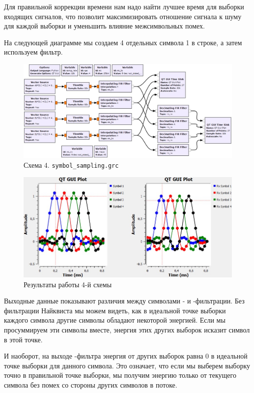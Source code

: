 \documentclass[a4paper, 12pt]{report}
\begin{document}
	Для правильной коррекции времени нам надо найти лучшее время для выборки входящих сигналов, что позволит максимизировать отношение сигнала к шуму для каждой выборки и уменьшить влияние межсимвольных помех.
	
	На следующей диаграмме мы создаем 4 отдельных символа 1 в  строке, а затем используем фильтр.
	\begin{figure}[H]
		\centering
		\includegraphics[width=1.0\textwidth]{10.jpg}
		\caption{Схема 4. \texttt{symbol\_sampling.grc}}
		\label{fig:10}
	\end{figure}
	\begin{figure}[H]
		\centering
		\includegraphics[width=1.0\textwidth]{11.jpg}
		\caption{Результаты работы 4-й схемы}
		\label{fig:11}
	\end{figure}
	Выходные данные показывают различия между символами - и -фильтрации. Без фильтрации Найквиста мы можем видеть, как в идеальной точке выборки каждого символа другие символы обладают некоторой энергией. Если мы просуммируем эти символы вместе, энергия этих других выборок исказит символ в этой точке.
	
	И наоборот, на выходе -фильтра энергия от других выборок равна 0 в идеальной точке выборки для данного символа. Это означает, что если мы выберем выборку точно в правильной точке выборки, мы получим энергию только от текущего символа без помех со стороны других символов в потоке.
	
\end{document}
